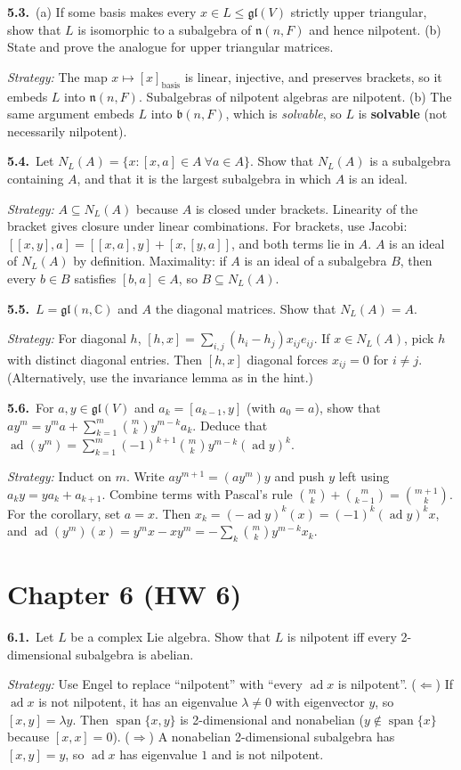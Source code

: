 \documentclass[11pt]{article}
\DeclareMathOperator{\ad}{ad}
\DeclareMathOperator{\Span}{span}
\newcommand{\gl}{\mathfrak{gl}}
\newcommand{\prob}[3]{%
	\par\medskip\noindent\textbf{#1.}\ #2\par
	\noindent\hspace*{1.5em}\begin{minipage}[t]{\dimexpr\linewidth-1.5em}
		\textit{Strategy:} #3
	\end{minipage}\par}
\begin{document}
\prob{5.3}{(a) If some basis makes every $x \in L \le \gl(V)$ strictly upper triangular, show that $L$ is isomorphic to a subalgebra of $\mathfrak{n}(n,F)$ and hence nilpotent.
	(b) State and prove the analogue for upper triangular matrices.}
{The map $x \mapsto [x]_{\text{basis}}$ is linear, injective, and preserves brackets, so it embeds $L$ into $\mathfrak{n}(n,F)$.
	Subalgebras of nilpotent algebras are nilpotent.
	(b) The same argument embeds $L$ into $\mathfrak{b}(n,F)$, which is \emph{solvable}, so $L$ is \textbf{solvable} (not necessarily nilpotent).}

\prob{5.4}{Let $N_L(A) = \{x : [x,a] \in A \ \forall a \in A\}$.
	Show that $N_L(A)$ is a subalgebra containing $A$, and that it is the largest subalgebra in which $A$ is an ideal.}
{$A \subseteq N_L(A)$ because $A$ is closed under brackets.
	Linearity of the bracket gives closure under linear combinations.
	For brackets, use Jacobi: $[[x,y],a] = [[x,a],y] + [x,[y,a]]$, and both terms lie in $A$.
	$A$ is an ideal of $N_L(A)$ by definition.
	Maximality: if $A$ is an ideal of a subalgebra $B$, then every $b \in B$ satisfies $[b,a] \in A$, so $B \subseteq N_L(A)$.}

\prob{5.5}{$L = \gl(n,\mathbb{C})$ and $A$ the diagonal matrices.
	Show that $N_L(A) = A$.}
{For diagonal $h$, $[h, x] = \sum_{i,j} (h_i - h_j)x_{ij}e_{ij}$.
	If $x \in N_L(A)$, pick $h$ with distinct diagonal entries.
	Then $[h,x]$ diagonal forces $x_{ij} = 0$ for $i \neq j$.
	(Alternatively, use the invariance lemma as in the hint.)}

\prob{5.6}{For $a, y \in \gl(V)$ and $a_k = [a_{k-1}, y]$ (with $a_0 = a$), show that $ay^m = y^m a + \sum_{k=1}^m \binom{m}{k} y^{m-k} a_k$.
	Deduce that $\ad(y^m) = \sum_{k=1}^m (-1)^{k+1}\binom{m}{k} y^{m-k}(\ad y)^k$.}
{Induct on $m$.
	Write $ay^{m+1} = (ay^m)y$ and push $y$ left using $a_k y = y a_k + a_{k+1}$.
	Combine terms with Pascal's rule $\binom{m}{k} + \binom{m}{k-1} = \binom{m+1}{k}$.
	For the corollary, set $a = x$.
	Then $x_k = (-\ad y)^k(x) = (-1)^k(\ad y)^k x$, and $\ad(y^m)(x) = y^m x - xy^m = -\sum_k \binom{m}{k} y^{m-k}x_k$.}

\section*{Chapter 6 (HW 6)}

\prob{6.1}{Let $L$ be a complex Lie algebra.
	Show that $L$ is nilpotent iff every 2-dimensional subalgebra is abelian.}
{Use Engel to replace ``nilpotent'' with ``every $\ad x$ is nilpotent''.
	($\Leftarrow$) If $\ad x$ is not nilpotent, it has an eigenvalue $\lambda \ne 0$ with eigenvector $y$, so $[x,y] = \lambda y$.
	Then $\Span\{x,y\}$ is 2-dimensional and nonabelian ($y \notin \Span\{x\}$ because $[x,x] = 0$).
	($\Rightarrow$) A nonabelian 2-dimensional subalgebra has $[x,y] = y$, so $\ad x$ has eigenvalue $1$ and is not nilpotent.}
\end{document}
